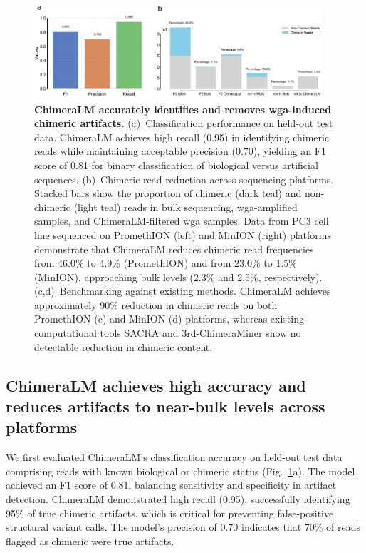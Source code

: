 \documentclass[pdflatex,sn-nature,lineno]{sn-jnl}%
\theoremstyle{thmstyleone}%
\theoremstyle{thmstyletwo}%
\theoremstyle{thmstylethree}%
\begin{document}
\begin{figure}[!ht]
	\begin{center}
		\includegraphics[width=0.95\textwidth]{final_figures/figure2}
	\end{center}
    \caption{{\bf ChimeraLM accurately identifies and removes \gls{wga}-induced chimeric artifacts.}
	(a)~Classification performance on held-out test data.
    ChimeraLM achieves high recall (0.95) in identifying chimeric reads while maintaining acceptable precision (0.70), yielding an F1 score of 0.81 for binary classification of biological versus artificial sequences.
	(b)~Chimeric read reduction across sequencing platforms.
    Stacked bars show the proportion of chimeric (dark teal) and non-chimeric (light teal) reads in bulk sequencing, \gls{wga}-amplified samples, and ChimeraLM-filtered \gls{wga} samples.
    Data from PC3 cell line sequenced on PromethION (left) and MinION (right) platforms demonstrate that ChimeraLM reduces chimeric read frequencies from 46.0\% to 4.9\% (PromethION) and from 23.0\% to 1.5\% (MinION), approaching bulk levels (2.3\% and 2.5\%, respectively).
	(c,d)~Benchmarking against existing methods.
    ChimeraLM achieves approximately 90\% reduction in chimeric reads on both PromethION (c) and MinION (d) platforms, whereas existing computational tools SACRA and 3rd-ChimeraMiner show no detectable reduction in chimeric content.}\label{fig:figure2}
\end{figure}

\subsection*{ChimeraLM achieves high accuracy and reduces artifacts to near-bulk levels across platforms}

We first evaluated ChimeraLM's classification accuracy on held-out test data comprising reads with known biological or chimeric status (Fig.~\ref{fig:figure2}a).
The model achieved an F1 score of 0.81, balancing sensitivity and specificity in artifact detection.
ChimeraLM demonstrated high recall (0.95), successfully identifying 95\% of true chimeric artifacts, which is critical for preventing false-positive structural variant calls.
The model's precision of 0.70 indicates that 70\% of reads flagged as chimeric were true artifacts.
\end{document}
